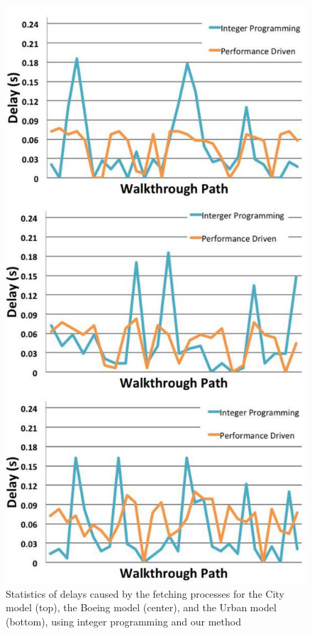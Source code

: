 \begin{figure}[ht]
\centering
\includegraphics[width=\columnwidth]
{comparison_to_lin_programming_all.pdf}
  \caption{Statistics of delays caused by the fetching processes for the City model (top), the Boeing model (center), and
the Urban model (bottom), using integer programming and our method}
  \label{fig:linProgramComparison}
\end{figure}

